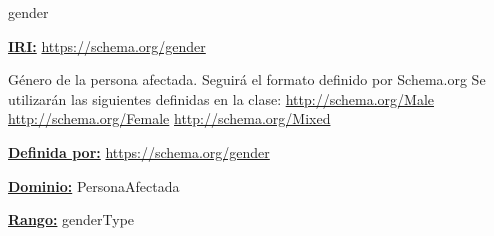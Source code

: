 





\begin{mybox}{gender}
\begin{flushleft}
\underline{\textbf{IRI:}}
\url{https://schema.org/gender}
\newline

Género de la persona afectada.
\newline Seguirá el formato definido por Schema.org \cite{schema_gender}
Se utilizarán las siguientes definidas en la clase:
\newline \url{http://schema.org/Male}
\newline \url{http://schema.org/Female}
\newline \url{http://schema.org/Mixed}
\newline

\underline{\textbf{Definida por:}}
\url{https://schema.org/gender}
\newline

\underline{\textbf{Dominio:}}
\newline PersonaAfectada
\newline

\underline{\textbf{Rango:}}
\newline genderType \cite{schema_gender_explicacion_rango}

\end{flushleft}
\end{mybox}







